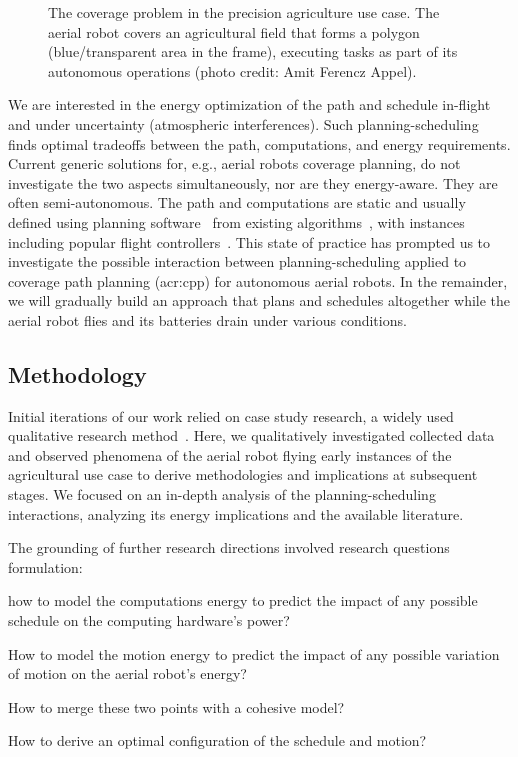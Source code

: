\begin{figure}[ht!]
  \centering
  
  \caption[The coverage problem in a precision agriculture use case]{The coverage problem in the precision agriculture use case. The aerial robot covers an agricultural field that forms a polygon (blue/transparent area in the frame), executing tasks as part of its autonomous operations {\scriptsize(photo credit: Amit Ferencz Appel)}.}
  \label{fig:plot2}
\end{figure}
We are interested in the energy optimization of the path and schedule in-flight and under uncertainty (atmospheric interferences). Such planning-scheduling finds optimal tradeoffs between the path, computations, and energy requirements. Current generic solutions for, e.g., aerial robots coverage planning, do not investigate the two aspects simultaneously, nor are they energy-aware. They are often semi-autonomous. The path and computations are static and usually defined using planning software~\citep{daponte2019review} from existing algorithms~\citep{choset2001coverage,galceran2013survey}, with instances including popular flight controllers~\citep{px4,papa}. This state of practice has prompted us to investigate the possible interaction between planning-scheduling applied to coverage path planning (\Gls{acr:cpp}) for autonomous aerial robots. In the remainder, we will gradually build an approach that plans and schedules altogether while the aerial robot flies and its batteries drain under various conditions.

\subsection{Methodology}

Initial iterations of our work relied on case study research, a widely used qualitative research method~\citep{darke1998successfully}. Here, we qualitatively investigated collected data and observed phenomena of the aerial robot flying early instances of the agricultural use case to derive methodologies and implications at subsequent stages. We focused on an in-depth analysis of the planning-scheduling interactions, analyzing its energy implications and the available literature. 

The grounding of further research directions involved research questions formulation: 
\begin{enumerate*}[label={(\alph*)},font={\textit}]
  \item how to model the computations energy to predict the impact of any possible schedule on the computing hardware's power? 
  \item How to model the motion energy to predict the impact of any possible variation of motion on the aerial robot's energy? 
  \item How to merge these two points with a cohesive model? 
  \item How to derive an optimal configuration of the schedule and motion?
\end{enumerate*} 

